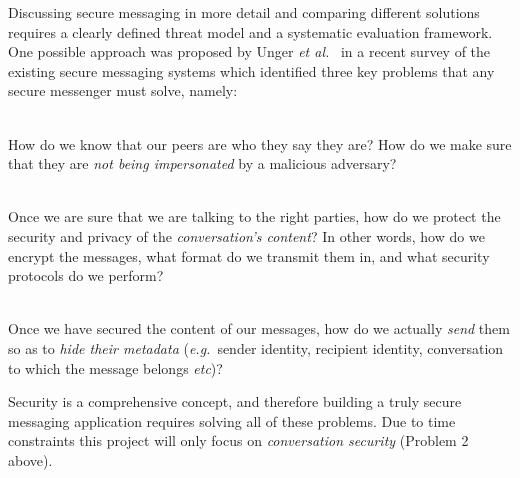 \documentclass[a4paper, twoside, 12pt]{report}
\begin{document}
Discussing secure messaging in more detail and comparing different solutions requires a clearly defined threat model and a systematic evaluation framework. One possible approach was proposed by Unger \textit{et al.}~\cite{unger2015sok} in a recent survey of the existing secure messaging systems which identified three key problems that any secure messenger must solve, namely:


\begin{description}[labelindent=0.5cm, leftmargin=1.3cm, rightmargin=0.5cm]
    \item[Problem 1: Trust Establishment]\hfill \\
        How do we know that our peers are who they say they are? How do we make sure that they are \emph{not being impersonated} by a malicious adversary?
    \item[Problem 2: Conversation Security]\hfill \\
        Once we are sure that we are talking to the right parties, how do we protect the security and privacy of the \emph{conversation's content}? In other words, how do we encrypt the messages, what format do we transmit them in, and what security protocols do we perform?
    \item[Problem 3: Transport Privacy]\hfill \\
        Once we have secured the content of our messages, how do we actually \emph{send} them so as to \emph{hide their metadata} (\textit{e.g.}~sender identity, recipient identity, conversation to which the message belongs \textit{etc})?
\end{description}
Security is a comprehensive concept, and therefore building a truly secure messaging application requires solving all of these problems. Due to time constraints this project will only focus on \emph{conversation security} (Problem 2 above).
\end{document}
